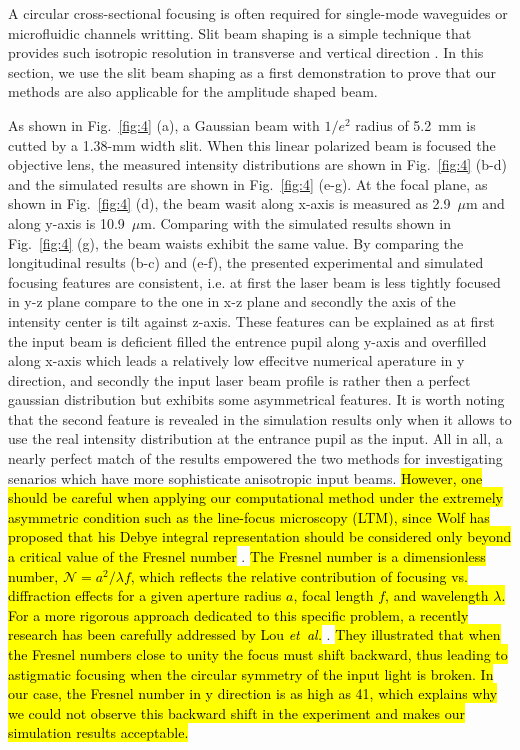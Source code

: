 \documentclass[9pt,twocolumn,twoside]{osajnl}
\begin{document}
A circular cross-sectional focusing is often required for single-mode waveguides or microfluidic channels writting. Slit beam shaping is a simple technique that provides such isotropic resolution in transverse and vertical direction \cite{cheng2003control, ams2005slit}. In this section, we use the slit beam shaping as a first demonstration to prove that our methods are also applicable for the amplitude shaped beam. 

As shown in Fig.~\ref{fig:4} (a), a Gaussian beam with $1/e^2$ radius of 5.2~mm is cutted by a 1.38-mm width slit. When this linear polarized beam is focused the objective lens, the measured intensity distributions are shown in Fig.~\ref{fig:4} (b-d) and the simulated results are shown in Fig.~\ref{fig:4} (e-g). At the focal plane, as shown in Fig.~\ref{fig:4} (d), the beam wasit along x-axis is measured as 2.9~$\mu$m and along y-axis is 10.9~$\mu$m. Comparing with the simulated results shown in Fig.~\ref{fig:4} (g), the beam waists exhibit the same value. By comparing the longitudinal results (b-c) and (e-f), the presented experimental and simulated focusing features are consistent, i.e. at first the laser beam is less tightly focused in y-z plane compare to the one in x-z plane and secondly the axis of the intensity center is tilt against z-axis. These features can be explained as at first the input beam is deficient filled the entrence pupil along y-axis and overfilled along x-axis which leads a relatively low effecitve numerical aperature in y direction, and secondly the input laser beam profile is rather then a perfect gaussian distribution but exhibits some asymmetrical features. It is worth noting that the second feature is revealed in the simulation results only when it allows to use the real intensity distribution at the entrance pupil as the input. All in all, a nearly perfect match of the results empowered the two methods for investigating senarios which have more sophisticate anisotropic input beams. \hl{However, one should be careful when applying our computational method under the extremely asymmetric condition such as the line-focus microscopy (LTM), since Wolf has proposed that his Debye integral representation should be considered only beyond a critical value of the Fresnel number} \cite{wolf1981conditions}. \hl{The Fresnel number is a dimensionless number, $\mathcal{N} = a^2/\lambda f$, which reflects the relative contribution of focusing vs. diffraction effects for a given aperture radius $a$, focal length $f$, and wavelength $\lambda$. For a more rigorous approach dedicated to this specific problem, a recently research has been carefully addressed by Lou \emph{et~al.}} \cite{lou2018better}. \hl{They illustrated that when the Fresnel numbers close to unity the focus must shift backward, thus leading to astigmatic focusing when the circular symmetry of the input light is broken. In our case, the Fresnel number in y direction is as high as 41, which explains why we could not observe this backward shift in the experiment and makes our simulation results acceptable.}   
\end{document}
